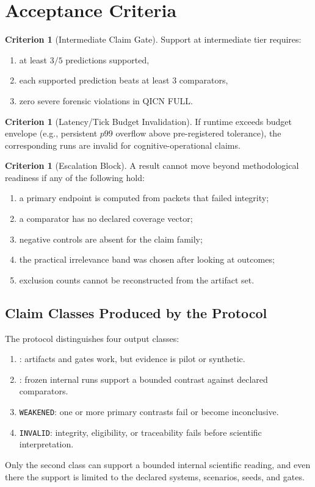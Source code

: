 \documentclass[11pt,a4paper]{article}
\theoremstyle{definition}
\newtheorem{criterion}[theorem]{Criterion}
\begin{document}
\section{Acceptance Criteria}
\begin{criterion}[Intermediate Claim Gate]
Support at intermediate tier requires:
\begin{enumerate}
\item at least $3/5$ predictions supported,
\item each supported prediction beats at least 3 comparators,
\item zero severe forensic violations in QICN FULL.
\end{enumerate}
\end{criterion}

\begin{criterion}[Latency/Tick Budget Invalidation]
If runtime exceeds budget envelope (e.g., persistent $p99$ overflow above pre-registered tolerance), the corresponding runs are invalid for cognitive-operational claims.
\end{criterion}

\begin{criterion}[Escalation Block]
A result cannot move beyond methodological readiness if any of the following hold:
\begin{enumerate}
\item a primary endpoint is computed from packets that failed integrity;
\item a comparator has no declared coverage vector;
\item negative controls are absent for the claim family;
\item the practical irrelevance band was chosen after looking at outcomes;
\item exclusion counts cannot be reconstructed from the artifact set.
\end{enumerate}
\end{criterion}

\subsection{Claim Classes Produced by the Protocol}
The protocol distinguishes four output classes:
\begin{enumerate}
\item \texttt{\allowbreak{}}: artifacts and gates work, but evidence is pilot or
synthetic.
\item \texttt{\allowbreak{}\allowbreak{}\allowbreak{}}: frozen internal runs support a
bounded contrast against declared comparators.
\item \texttt{WEAKENED}: one or more primary contrasts fail or become
inconclusive.
\item \texttt{INVALID}: integrity, eligibility, or traceability fails before
scientific interpretation.
\end{enumerate}
Only the second class can support a bounded internal scientific reading, and even
there the support is limited to the declared systems, scenarios, seeds, and gates.
\end{document}
